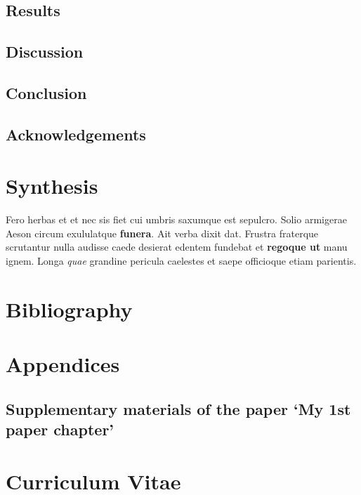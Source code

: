 \documentclass[
  a4paper,
  oneside]{ETH-thesis-template}
\begin{document}
\section{Results}\label{sec-results}

\section{Discussion}\label{sec-discussion}

\section{Conclusion}\label{sec-conclusion}

\section{Acknowledgements}\label{sec-acknowledgements}


\chapter{Synthesis}\label{sec-synthesis_chap}

\newpage

Fero herbas et et nec sis fiet cui umbris saxumque est sepulcro. Solio
armigerae Aeson circum exululatque \textbf{funera}. Ait verba dixit dat.
Frustra fraterque scrutantur nulla audisse caede desierat edentem
fundebat et \textbf{regoque ut} manu ignem. Longa \emph{quae} grandine
pericula caelestes et saepe officioque etiam parientis.


\chapter{Bibliography}\label{bibliography}

\newpage

\printbibliography[heading=none]


\chapter{Appendices}\label{appendices}

\newpage

\setcounter{section}{0}
\renewcommand{\thesection}{\Alph{section}}

\section{Supplementary materials of the paper `My 1st paper
chapter'}\label{supplementary-materials-of-the-paper-my-1st-paper-chapter}

\newpage

\newpage


\chapter{Curriculum Vitae}\label{curriculum-vitae}


\end{document}
